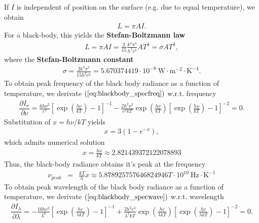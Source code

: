 \documentclass [12pt, a4paper] {article}
\newcommand{\pdiff}[2]
{
	\dfrac{\partial #1}{\partial #2}
}
\begin{document}
If $I$ is independent of position on the surface (e.g. due to equal 
temperature), we obtain 
\begin {eqnarray}
    L = \pi AI.
\end {eqnarray}
For a black-body, this yields the \textbf{Stefan-Boltzmann law}
\begin {eqnarray}
    \label{eq:boltzmann}
    L 
    =
    \pi A I
    =
    \frac{2}{15}\frac{k^4\pi^5}{h^3c^2}AT^4 
    =
    \sigma AT^4, 
\end {eqnarray}
where the \textbf{Stefan-Boltzmann constant}
\begin {eqnarray}
    \sigma = \frac{2k^4\pi^5}{15h^3c^2} 
    = 
    5.670374419\cdot 10^{-8}\:\textrm{W}\cdot\textrm{m}^{-2}\cdot \textrm{K}^{-4}.
\end {eqnarray}
To obtain peak frequency of the black body radiance as a function of temperature,
we derivate $(\ref{eq:blackbody_specfreq})$ w.r.t. frequency
\begin{eqnarray}
    \pdiff{I_\nu}{\nu}
    =
    \frac{6h\nu^2}{c^2}
    \left[\exp\left(\frac{h\nu}{kT}\right) - 1\right]^{-1}
     - \frac{2h^2\nu^3}{c^2kT}\exp\left(\frac{h\nu}{kT}\right)
     \left[\exp\left(\frac{h\nu}{kT}\right) - 1\right]^{-2}
     = 0.
\end {eqnarray}
Substitution of $x=h\nu/kT$ yields 
\begin {eqnarray}
    x = 3(1 - e^{-x}),
\end {eqnarray}
which admits numerical solution
\begin {eqnarray}
    x = \frac{h\nu}{kT} \approx 2.821439372122078893
\end {eqnarray}
Thus, the black-body radiance obtains it's peak at the frequency
\begin {eqnarray}
    \nu_{peak} 
    &=& 
    \frac{kT}{h}x \approx 5.878925757646824946 T\cdot 10^{10}
    \:\textrm{Hz}\cdot\textrm{K}^{-1}
\end {eqnarray} 
To obtain peak wavelength of the black body radiance as a function of temperature,
we derivate $(\ref{eq:blackbody_specwave})$ w.r.t. wavelength
\begin {eqnarray}
    \pdiff{I_\lambda}{\lambda}
    =
    - \frac{10hc^2}{\lambda^6}
    \left[
        \exp\left(\frac{hc}{\lambda kT}\right) - 1
    \right]^{-1}
    +
    \frac{2h^2c^3}{\lambda^7kT}
    \exp\left(\frac{hc}{\lambda kT}\right)
    \left[
        \exp\left(\frac{hc}{\lambda kT}\right) - 1
    \right]^{-2}
    =
    0.
\end {eqnarray}
\end{document}
